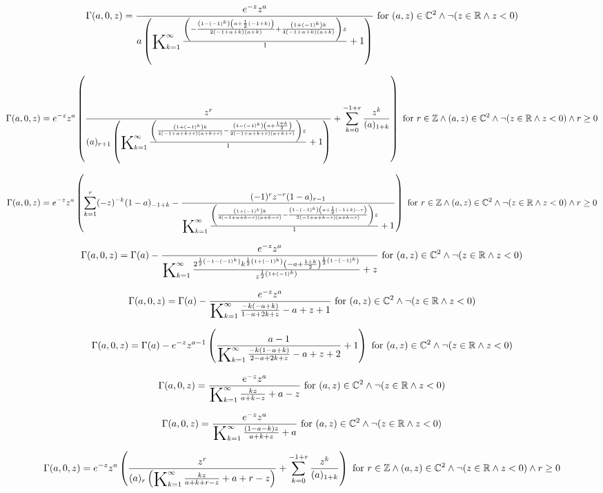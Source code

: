 \documentclass{article}
\newcommand{\bigK}{\mathop{\raisebox{-5pt}{\huge K}}}
\begin{document}
\[\Gamma (a,0,z)=\frac{e^{-z} z^a}{a \left(\bigK_{k=1}^{\infty}\frac{\left(-\frac{\left(1-(-1)^k\right) \left(a+\frac{1}{2} (-1+k)\right)}{2 (-1+a+k) (a+k)}+\frac{\left(1+(-1)^k\right) k}{4 (-1+a+k) (a+k)}\right) z}{1}+1\right)}\text{ for }(a,z)\in \mathbb{C}^2\land \neg (z\in \mathbb{R}\land z<0)\] 

\[\Gamma (a,0,z)=e^{-z} z^a \left(\frac{z^r}{(a)_{r+1} \left(\bigK_{k=1}^{\infty}\frac{\left(\frac{\left(1+(-1)^k\right) k}{4 (-1+a+k+r) (a+k+r)}-\frac{\left(1-(-1)^k\right) \left(a+\frac{1+k}{2}\right)}{2 (-1+a+k+r) (a+k+r)}\right) z}{1}+1\right)}+\sum _{k=0}^{-1+r} \frac{z^k}{(a)_{1+k}}\right)\text{ for }r\in \mathbb{Z}\land (a,z)\in \mathbb{C}^2\land \neg (z\in \mathbb{R}\land z<0)\land r\geq 0\] 

\[\Gamma (a,0,z)=e^{-z} z^a \left(\sum _{k=1}^r (-z)^{-k} (1-a)_{-1+k}-\frac{(-1)^r z^{-r} (1-a)_{r-1}}{\bigK_{k=1}^{\infty}\frac{\left(\frac{\left(1+(-1)^k\right) k}{4 (-1+a+k-r) (a+k-r)}-\frac{\left(1-(-1)^k\right) \left(a+\frac{1}{2} (-1+k)-r\right)}{2 (-1+a+k-r) (a+k-r)}\right) z}{1}+1}\right)\text{ for }r\in \mathbb{Z}\land (a,z)\in \mathbb{C}^2\land \neg (z\in \mathbb{R}\land z<0)\land r\geq 0\] 

\[\Gamma (a,0,z)=\Gamma (a)-\frac{e^{-z} z^a}{\bigK_{k=1}^{\infty}\frac{2^{\frac{1}{2} \left(-1-(-1)^k\right)} k^{\frac{1}{2} \left(1+(-1)^k\right)} \left(-a+\frac{1+k}{2}\right)^{\frac{1}{2} \left(1-(-1)^k\right)}}{z^{\frac{1}{2} \left(1+(-1)^k\right)}}+z}\text{ for }(a,z)\in \mathbb{C}^2\land \neg (z\in \mathbb{R}\land z<0)\] 

\[\Gamma (a,0,z)=\Gamma (a)-\frac{e^{-z} z^a}{\bigK_{k=1}^{\infty}\frac{-k (-a+k)}{1-a+2 k+z}-a+z+1}\text{ for }(a,z)\in \mathbb{C}^2\land \neg (z\in \mathbb{R}\land z<0)\] 

\[\Gamma (a,0,z)=\Gamma (a)-e^{-z} z^{a-1} \left(\frac{a-1}{\bigK_{k=1}^{\infty}\frac{-k (1-a+k)}{2-a+2 k+z}-a+z+2}+1\right)\text{ for }(a,z)\in \mathbb{C}^2\land \neg (z\in \mathbb{R}\land z<0)\] 

\[\Gamma (a,0,z)=\frac{e^{-z} z^a}{\bigK_{k=1}^{\infty}\frac{k z}{a+k-z}+a-z}\text{ for }(a,z)\in \mathbb{C}^2\land \neg (z\in \mathbb{R}\land z<0)\] 

\[\Gamma (a,0,z)=\frac{e^{-z} z^a}{\bigK_{k=1}^{\infty}\frac{(1-a-k) z}{a+k+z}+a}\text{ for }(a,z)\in \mathbb{C}^2\land \neg (z\in \mathbb{R}\land z<0)\] 

\[\Gamma (a,0,z)=e^{-z} z^a \left(\frac{z^r}{(a)_r \left(\bigK_{k=1}^{\infty}\frac{k z}{a+k+r-z}+a+r-z\right)}+\sum _{k=0}^{-1+r} \frac{z^k}{(a)_{1+k}}\right)\text{ for }r\in \mathbb{Z}\land (a,z)\in \mathbb{C}^2\land \neg (z\in \mathbb{R}\land z<0)\land r\geq 0\] 
\end{document}
